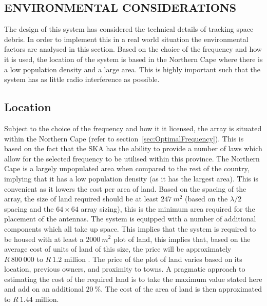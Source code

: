 \documentclass[11pt]{witseiepaper}
\begin{document}
\begin{bibunit}[witseie]
\section{ENVIRONMENTAL CONSIDERATIONS} \label{sec:EnvironmentalConsiderations}
The design of this system has considered the technical details of tracking space debris. In order to implement this in a real world situation the environmental factors are analysed in this section.
Based on the choice of the frequency and how it is used, the location of the system is based in the Northern Cape where there is a low population density and a large area. This is highly important such that the system has as little radio interference as possible.

\subsection{Location} \label{sec:Location}
Subject to the choice of the frequency and how it it licensed, the array is situated within the Northern Cape (refer to section~\ref{sec:OptimalFrequency}). This is based on the fact that the SKA has the ability to provide a number of laws which allow for the selected frequency to be utilised within this province.
The Northern Cape is a largely unpopulated area when compared to the rest of the country, implying that it has a low population density (as it has the largest area). This is convenient as it lowers the cost per area of land. 
Based on the spacing of the array, the size of land required should be at least $247~m^2$ (based on the $\lambda/2$ spacing and the $64 \times 64$ array sizing), this is the minimum area required for the placement of the antennas. The system is equipped with a number of additional components which all take up space.
This implies that the system is required to be housed with at least a $2000~m^2$ plot of land, this implies that, based on the average cost of units of land of this size, the price will be approximately $R~800~000$ to $R~1.2$ million \cite{LocationPrice1, LocationPrice2, LocationPrice3}.
The price of the plot of land varies based on its location, previous owners, and proximity to towns. A pragmatic approach to estimating the cost of the required land is to take the maximum value stated here and add on an additional $20~\%$. The cost of the area of land is then approximated to $R~1.44$ million.


\end{bibunit}
\end{document}

